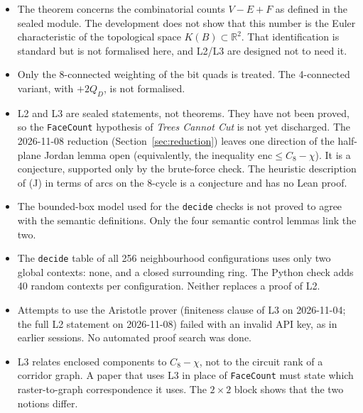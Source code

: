 \documentclass[11pt]{article}
\theoremstyle{definition}
\theoremstyle{remark}
\begin{document}
\begin{itemize}
\item The theorem concerns the combinatorial counts $V-E+F$ as defined in the
  sealed module. The development does not show that this number is the Euler
  characteristic of the topological space $K(B)\subset\mathbb{R}^2$. That
  identification is standard but is not formalised here, and L2/L3 are
  designed not to need it.
\item Only the 8-connected weighting of the bit quads is treated. The
  4-connected variant, with $+2Q_D$, is not formalised.
\item L2 and L3 are sealed statements, not theorems. They have not been
  proved, so the \texttt{FaceCount} hypothesis of \emph{Trees Cannot Cut} is
  not yet discharged. The 2026-11-08 reduction (Section~\ref{sec:reduction})
  leaves one direction of the half-plane Jordan lemma open (equivalently, the
  inequality $\mathrm{enc}\le C_8-\chi$). It is a conjecture, supported only by the
  brute-force check. The
  heuristic description of (J) in terms of arcs on the 8-cycle is a conjecture and
  has no Lean proof.
\item The bounded-box model used for the \texttt{decide} checks is not proved
  to agree with the semantic definitions. Only the four semantic control lemmas
  link the two.
\item The \texttt{decide} table of all 256 neighbourhood configurations
  uses only two global contexts: none, and a closed surrounding ring. The Python
  check adds 40 random contexts per configuration. Neither replaces a proof of
  L2.
\item Attempts to use the Aristotle prover (finiteness clause of L3 on
  2026-11-04; the full L2 statement on 2026-11-08) failed with an invalid API
  key, as in earlier sessions. No automated proof search was done.
\item L3 relates enclosed components to $C_8-\chi$, not to the circuit rank of
  a corridor graph. A paper that uses L3 in place of \texttt{FaceCount} must
  state which raster-to-graph correspondence it uses. The $2\times2$ block
  shows that the two notions differ.
\end{itemize}
\end{document}

